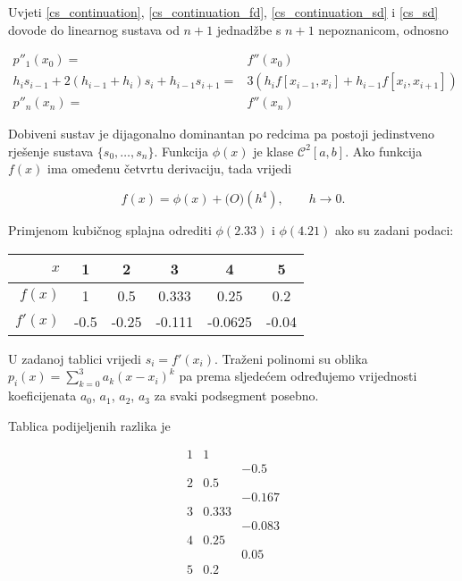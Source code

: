 Uvjeti \ref{cs_continuation}, \ref{cs_continuation_fd}, \ref{cs_continuation_sd} i \ref{cs_sd} dovode do linearnog sustava od $n+1$ jednadžbe s $n+1$ nepoznanicom, odnosno

\begin{align*}
p''_1(x_0) =& f''(x_0)\\
h_is_{i-1}+2(h_{i-1}+h_i)s_i+h_{i-1}s_{i+1}=&3(h_if[x_{i-1},x_i]+h_{i-1}f[x_i,x_{i+1}])\\
p''_n(x_n) =& f''(x_n)
\end{align*}

Dobiveni sustav je dijagonalno dominantan po redcima pa postoji jedinstveno rješenje sustava $\{s_0,\dots,s_n\}$. Funkcija $\phi(x)$ je klase $\mathcal{C}^2[a,b]$. Ako funkcija $f(x)$ ima omeđenu četvrtu derivaciju, tada vrijedi

$$
f(x)=\phi(x) + \mathcal(O)(h^4),\qquad h\to0.
$$

\newpage

\begin{example}
    Primjenom kubičnog splajna odrediti $\phi(2.33)$ i $\phi(4.21)$ ako su zadani podaci:
    
    \center
    \begin{tabular}{r|c|c|c|c|c}
        $x$ & 1 & 2 & 3 & 4 & 5 \\
        \hline
        $f(x)$ & 1 & 0.5 & 0.333 & 0.25 & 0.2 \\
        \hline
        $f'(x)$ & -0.5 & -0.25 & -0.111 & -0.0625 & -0.04
    \end{tabular}
\end{example}

U zadanoj tablici vrijedi $s_i=f'(x_i)$. Traženi polinomi su oblika $p_i(x)=\sum_{k=0}^3a_k(x-x_i)^k$ pa prema sljedećem određujemo vrijednosti koeficijenata $a_0$, $a_1$, $a_2$, $a_3$ za svaki podsegment posebno.

Tablica podijeljenih razlika je

$$
\begin{array}{ccc}
1&1&\\
&&-0.5\\
2&0.5\\
&&-0.167\\
3&0.333\\
&&-0.083\\
4&0.25\\
&&0.05\\
5&0.2\\
\end{array}
$$

